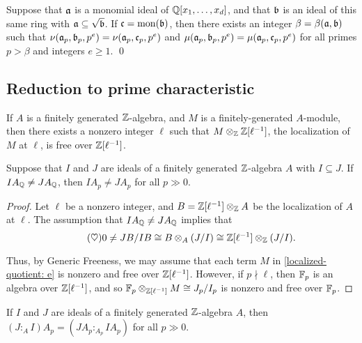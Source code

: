 \documentclass[11pt]{amsart}
\begin{document}
\begin{corollary}
Suppose that $\mathfrak{a}$ is a monomial ideal of $\mathbb{Q}[x_1, \ldots, x_d]$, and that $\mathfrak{b}$ is an ideal of this same ring with $\mathfrak{a} \subseteq \sqrt{\mathfrak{b}}$.  If $\mathfrak{c} = \operatorname{mon}(\mathfrak{b})$, then there exists an integer $\beta = \beta(\mathfrak{a}, \mathfrak{b})$ such that $\nu(\mathfrak{a}_p, \mathfrak{b}_p, p^e) = \nu(\mathfrak{a}_p, \mathfrak{c}_p, p^e)$ and $\mu(\mathfrak{a}_p, \mathfrak{b}_p, p^e) = \mu(\mathfrak{a}_p, \mathfrak{c}_p, p^e)$ for all primes $p > \beta$ and integers $e \geq 1$. \qed
\end{corollary}



\subsection{Reduction to prime characteristic}

\begin{remark}  If $A$ is a finitely generated $\mathbb{Z}$-algebra, and $M$ is a finitely-generated $A$-module, then there exists a nonzero integer $\ell$ such that $M \otimes_{\mathbb{Z}} \mathbb{Z}[\ell^{-1}]$, the localization of $M$ at $\ell$, is free over $\mathbb{Z}[\ell^{-1}]$.
\end{remark}

\begin{lemma}
\label{noncontainment mod p: L}
Suppose that $I$ and $J$ are ideals of a finitely generated $\mathbb{Z}$-algebra $A$ with $I \subseteq J$.  If $IA_{\mathbb{Q}} \neq JA_{\mathbb{Q}}$, then $IA_p \neq JA_p$ for all $p \gg 0$.
\end{lemma}

\begin{proof}
Let $\ell$ be a nonzero integer, and $B = \mathbb{Z}[\ell^{-1}] \otimes_{\mathbb{Z}} A$ be the localization of $A$ at $\ell$.  The assumption that $IA_{\mathbb{Q}} \neq JA_{\mathbb{Q}}$ implies that
%
\begin{equation}
\label{localized-quotient: e}
\tag{$\heartsuit$}
0 \neq JB/IB \cong B \otimes_A (J/I) \cong \mathbb{Z}[\ell^{-1}] \otimes_{\mathbb{Z}} (J/I) .
\end{equation}

Thus, by Generic Freeness, we may assume that each term $M$ in \eqref{localized-quotient: e} is nonzero and free over $\mathbb{Z}[\ell^{-1}]$.  However,  if $p \nmid \ell$, then $\mathbb{F}_p$ is an algebra over $\mathbb{Z}[\ell^{-1}]$, and so $\mathbb{F}_p \otimes_{\mathbb{Z}[\ell^{-1}]} M \cong J_p / I_p$ is nonzero and free over $\mathbb{F}_p$.
\end{proof}

\begin{lemma}
\label{colon mod p: L}
 If $I$ and $J$ are ideals of a finitely generated $\mathbb{Z}$-algebra $A$, then $(J:_A I)A _p = (JA_p :_{A_p} IA_p)$ for all $p \gg 0$.
\end{lemma}
\end{document}
